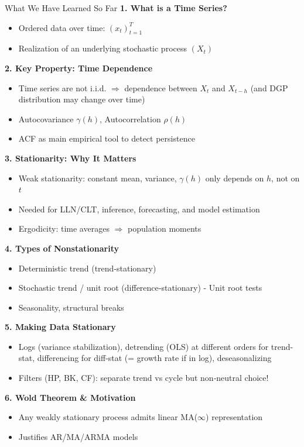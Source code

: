 \documentclass{beamer}
\begin{document}
\begin{frame}{What We Have Learned So Far}
\scriptsize
\pause
\textbf{1. What is a Time Series?}
\begin{itemize}
    \item Ordered data over time: $(x_t)_{t=1}^T$
    \item Realization of an underlying stochastic process $(X_t)$
\end{itemize}
\pause
\textbf{2. Key Property: Time Dependence}
\begin{itemize}
    \item Time series are not i.i.d. $\Rightarrow$ dependence between $X_t$ and $X_{t-h}$ (and DGP distribution may change over time)
    \item Autocovariance $\gamma(h)$, Autocorrelation $\rho(h)$
    \item ACF as main empirical tool to detect persistence
\end{itemize}
\pause
\textbf{3. Stationarity: Why It Matters}
\begin{itemize}
    \item Weak stationarity: constant mean, variance, $\gamma(h)$ only depends on $h$, not on $t$
    \item Needed for LLN/CLT, inference, forecasting, and model estimation
    \item Ergodicity: time averages $\Rightarrow$ population moments
\end{itemize}
\pause
\textbf{4. Types of Nonstationarity}
\begin{itemize}
    \item Deterministic trend (trend‐stationary)
    \item Stochastic trend / unit root (difference‐stationary) - Unit root tests
    \item Seasonality, structural breaks
\end{itemize}
\pause
\textbf{5. Making Data Stationary}
\begin{itemize}
    \item Logs (variance stabilization), detrending (OLS) at different orders for trend-stat, differencing for diff-stat (= growth rate if in log), deseasonalizing
    \item Filters (HP, BK, CF): separate trend vs cycle but non‐neutral choice!
\end{itemize}
\pause
\textbf{6. Wold Theorem \& Motivation}
\begin{itemize}
    \item Any weakly stationary process admits linear MA($\infty$) representation
    \item Justifies AR/MA/ARMA models
\end{itemize}

\end{frame}
\end{document}
